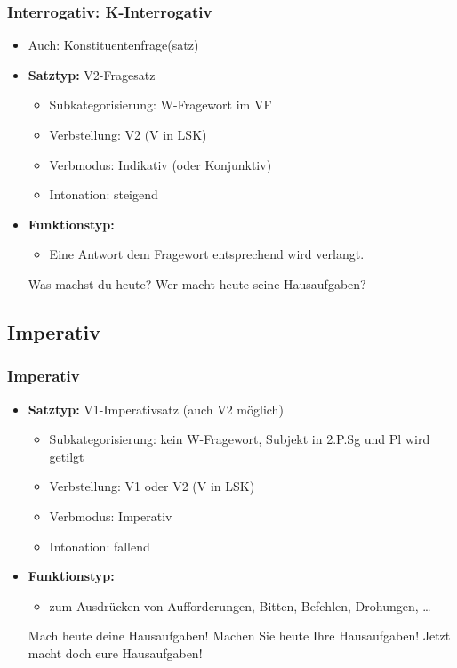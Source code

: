 \begin{frame}
\frametitle{Interrogativ: K-Interrogativ}

\begin{itemize}
	\item Auch: Konstituentenfrage(satz)
	\item \textbf{Satztyp:} V2-Fragesatz
	\begin{itemize}
		\item Subkategorisierung: W-Fragewort im VF
		\item Verbstellung: V2 (V in LSK)
		\item Verbmodus: Indikativ (oder Konjunktiv)
		\item Intonation: steigend
	\end{itemize}
	\item \textbf{Funktionstyp:}
	\begin{itemize}
		\item Eine Antwort dem Fragewort entsprechend wird verlangt.
	\end{itemize}
	
	\eal
	\ex Was machst du heute?
	\ex Wer macht heute seine Hausaufgaben?
	\zl
	
\end{itemize}

\end{frame}


\subsection{Imperativ}


\begin{frame}
\frametitle{Imperativ}

\begin{itemize}
	\item \textbf{Satztyp:} V1-Imperativsatz (auch V2 möglich)
	\begin{itemize}
		\item Subkategorisierung: kein W-Fragewort, Subjekt in 2.P.Sg und Pl wird getilgt
		\item Verbstellung: V1 oder V2 (V in LSK)
		\item Verbmodus: Imperativ
		\item Intonation: fallend
	\end{itemize}
	\item \textbf{Funktionstyp:}
	\begin{itemize}
		\item zum Ausdrücken von Aufforderungen, Bitten, Befehlen, Drohungen, \dots
	\end{itemize}
	
	\eal
	\ex Mach heute deine Hausaufgaben!
	\ex Machen Sie heute Ihre Hausaufgaben!
	\ex Jetzt macht doch eure Hausaufgaben!
	\zl
	
\end{itemize}

\end{frame}


